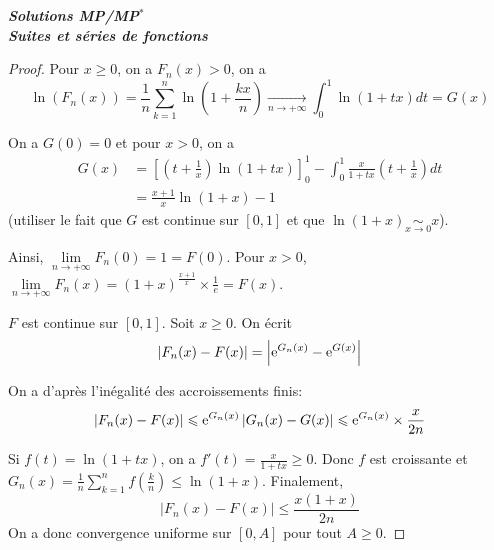 \documentclass[12pt]{article}
\begin{document}
\begin{titlepage}
	\centering
	\vspace*{\fill}
	\Huge \textit{\textbf{Solutions MP/MP$^*$\\ Suites et séries de fonctions}}
	\vspace*{\fill}
\end{titlepage}

\begin{proof}
    Pour $x\geqslant0$, on a $F_{n}(x)>0$, on a 
    \begin{equation*}
        \ln\left(F_{n}(x)\right)=\frac{1}{n}\sum_{k=1}^{n}\ln\left(1+\frac{kx}{n}\right)\xrightarrow[n\to+\infty]{}\int_{0}^{1}\ln\left(1+tx\right)dt=G(x)
    \end{equation*}

    On a $G(0)=0$ et pour $x>0$, on a
    \begin{align*}
        G(x)
        &= \left[\left(t+\frac{1}{x}\right)\ln(1+tx)\right]_{0}^{1}-\int_{0}^{1}\frac{x}{1+tx}\left(t+\frac{1}{x}\right)dt\\
        &=\frac{x+1}{x}\ln(1+x)-1
    \end{align*}
    (utiliser le fait que $G$ est continue sur $[0,1]$ et que $\ln(1+x)\underset{x\to0}{\sim}x$).

    Ainsi, $\lim\limits_{n\to+\infty}F_{n}(0)=1=F(0)$.
    Pour $x>0$, $\lim\limits_{n\to+\infty}F_{n}(x)=\left(1+x\right)^{\frac{x+1}{x}}\times\frac{1}{e}=F(x)$.

    $F$ est continue sur $[0,1]$. Soit $x\geqslant0$. On écrit 
    \begin{equation*}
        \left\lvert F_{n}(x)-F(x)\right\rvert=\left\lvert\mathrm{e}^{G_{n}(x)}-\mathrm{e}^{G(x)}\right\rvert
    \end{equation*}

    
    On a d'après l'inégalité des accroissements finis: 
    \begin{equation*}
        \left\lvert F_{n}(x)-F(x)\right\rvert\leqslant\mathrm{e}^{G_{n}(x)}\left\lvert G_{n}(x)-G(x)\right\rvert\leqslant\mathrm{e}^{G_{n}(x)}\times\frac{x}{2n}
    \end{equation*}
    
    Si $f(t)=\ln\left(1+tx\right)$, on a $f'(t)=\frac{x}{1+tx}\geqslant0$. Donc $f$ est croissante et $G_{n}(x)=\frac{1}{n}\sum_{k=1}^{n}f\left(\frac{k}{n}\right)\leqslant\ln(1+x)$. Finalement, 
    \begin{equation*}
        \left\lvert F_{n}(x)-F(x)\right\rvert\leqslant\frac{x(1+x)}{2n}
    \end{equation*}
    On a donc convergence uniforme sur $[0,A]$ pour tout $A\geqslant0$.
\end{proof}
\end{document}
